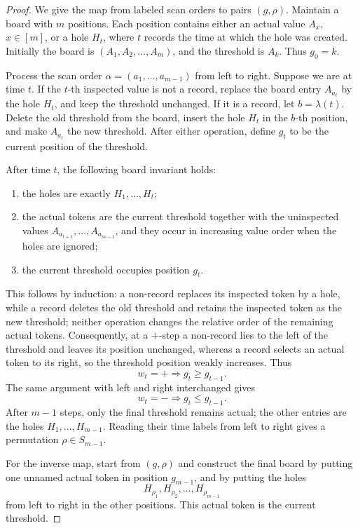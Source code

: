 \documentclass[11pt,letterpaper,reqno]{amsart}
\theoremstyle{definition}
\begin{document}
\begin{proof}
We give the map from labeled scan orders to pairs \((g,\rho)\).  Maintain a
board with \(m\) positions.  Each position contains either an actual value
\(A_x\), \(x\in[m]\), or a hole \(H_t\), where \(t\) records the time at which
the hole was created.  Initially the board is $(A_1,A_2,\ldots,A_m)$, and the threshold is \(A_k\). Thus \(g_0=k\).

Process the scan order $\alpha=(a_1,\ldots,a_{m-1})$ from left to right.  Suppose we are at time \(t\).  If the \(t\)-th inspected
value is not a record, replace the board entry \(A_{a_t}\) by the hole
\(H_t\), and keep the threshold unchanged.  If it is a record, let
\(b=\lambda(t)\).  Delete the old threshold from the board, insert the hole
\(H_t\) in the \(b\)-th position, and make \(A_{a_t}\) the new threshold.
After either operation, define \(g_t\) to be the current position of the
threshold.

After time \(t\), the following board invariant holds:
\begin{enumerate}[label=(\roman*)]
\item the holes are exactly \(H_1,\ldots,H_t\);
\item the actual tokens are the current threshold together with the
uninspected values \(A_{a_{t+1}},\ldots,A_{a_{m-1}}\), and they occur in
increasing value order when the holes are ignored;
\item the current threshold occupies position \(g_t\).
\end{enumerate}
This follows by induction: a non-record replaces its inspected token by a
hole, while a record deletes the old threshold and retains the inspected token
as the new threshold; neither operation changes the relative order of the
remaining actual tokens.  Consequently, at a \(+\)-step a non-record lies to
the left of the threshold and leaves its position unchanged, whereas a record
selects an actual token to its right, so the threshold position weakly
increases.  Thus
\[
w_t=+\Longrightarrow g_t\ge g_{t-1}.
\]
The same argument with left and right interchanged gives
\[
w_t=-\Longrightarrow g_t\le g_{t-1}.
\]
After \(m-1\) steps, only the final threshold remains actual; the other
entries are the holes \(H_1,\ldots,H_{m-1}\).  Reading their time labels from
left to right gives a permutation \(\rho\in S_{m-1}\).

For the inverse map, start from \((g,\rho)\) and construct the final
board by putting one unnamed actual token in position \(g_{m-1}\), and by
putting the holes
\[
H_{\rho_1},H_{\rho_2},\ldots,H_{\rho_{m-1}}
\]
from left to right in the other positions.  This actual token is the current
threshold.


\end{proof}
\end{document}
